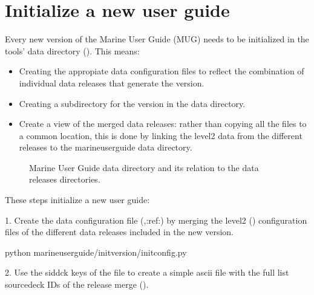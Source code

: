 \documentclass[letterpaper,10pt,english]{sphinxmanual}
\let\sphinxpxdimen\pdfpxdimen\else\newdimen\sphinxpxdimen
\begin{document}
\chapter{Initialize a new user guide}
\label{\detokenize{index:initialize-a-new-user-guide}}
Every new version of the Marine User Guide (MUG) needs to be initialized in the
tools’ data directory ({\hyperref[\detokenize{index:file-links}]{}}). This means:
\begin{itemize}
\item {} 
Creating the appropiate data configuration files to reflect the combination of individual data releases that generate the version.

\item {} 
Creating a subdirectory for the version in the data directory.

\item {} 
Create a view of the merged data releases: rather than copying all the files to a common location, this is done by linking the level2 data from the different releases to the marine\sphinxhyphen{}user\sphinxhyphen{}guide data directory.

\end{itemize}

\begin{figure}[htbp]
\centering
\capstart

\noindent\sphinxincludegraphics[width=300\sphinxpxdimen]{{file_links}.png}
\caption{Marine User Guide data directory and its relation to the data releases directories.}\label{\detokenize{index:id1}}\label{\detokenize{index:file-links}}\end{figure}

These steps initialize a new user guide:

1. Create the data configuration file (,:ref:) by merging the level2 ({\hyperref[\detokenize{index:level2}]{}}) configuration files of the different data releases included in the new version.

\begin{sphinxVerbatim}[commandchars=\\\{\}]
python marine\PYGZhy{}user\PYGZhy{}guide/init\PYGZus{}version/init\PYGZus{}config.py
\end{sphinxVerbatim}

2. Use the sid\sphinxhyphen{}dck keys of the  file to create a simple ascii file with the full list source\sphinxhyphen{}deck IDs of the release merge ().
\end{document}
